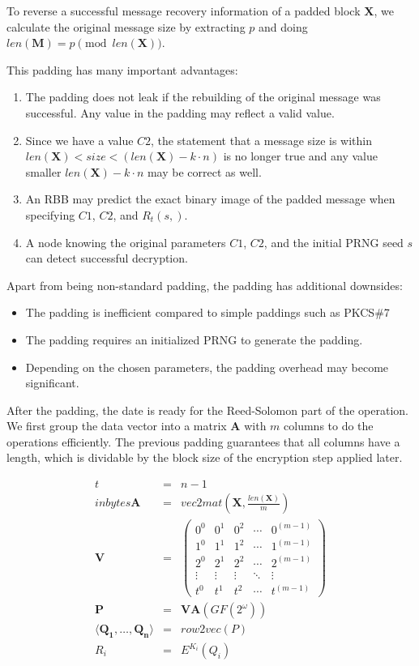 To reverse a successful message recovery information of a padded block $\mathbf{X}$, we calculate the original message size by extracting $p$ and doing $len(\mathbf{M})=p \pmod{ len(\mathbf{X})}$.

This padding has many important advantages:
\begin{enumerate}
	\item The padding does not leak if the rebuilding of the original message was successful. Any value in the padding may reflect a valid value.
	\item Since we have a value $C2$, the statement that a message size is within $len(\mathbf{X})<size<(len(\mathbf{X})-k\cdot n)$ is no longer true and any value smaller $len(\mathbf{X})-k\cdot n$ may be correct as well.
	\item An RBB may predict the exact binary image of the padded message when specifying $C1$, $C2$, and $R_{t}(s,)$.
	\item A node knowing the original parameters $C1$, $C2$, and the initial PRNG seed $s$ can detect successful decryption.
\end{enumerate}

Apart from being non-standard padding, the padding has additional downsides:
\begin{itemize}
	\item The padding is inefficient compared to simple paddings such as PKCS\#7
	\item The padding requires an initialized PRNG to generate the padding.
	\item Depending on the chosen parameters, the padding overhead may become significant. 
\end{itemize}

After the padding, the date is ready for the Reed-Solomon part of the operation. We first group the data vector into a matrix $\mathbf{A}$ with $m$ columns to do the operations efficiently. The previous padding guarantees that all columns have a length, which is dividable by the block size of the encryption step applied later.

\begin{eqnarray}
t          & = & n-1\\in bytes
\mathbf{A} & = & vec2mat\left(\mathbf{X},\frac{len\left(\mathbf{X}\right)}{m}\right)\\
\mathbf{V} & = & \left(\begin{matrix}
0^0 & 0^1 & 0^2 & \cdots & 0^{(m-1)} \\
1^0 & 1^1 & 1^2 & \cdots & 1^{(m-1)} \\
2^0 & 2^1 & 2^2 & \cdots & 2^{(m-1)} \\
\vdots & \vdots & \vdots & \ddots & \vdots \\
t^0 & t^1 & t^2 & \cdots & t^{(m-1)}
\end{matrix}\right)\\
\mathbf{P} & = & \mathbf{V}\mathbf{A} \left(GF\left(2^\omega\right)\right)\\
\langle \mathbf{Q_1}, \ldots , \mathbf{Q_n} \rangle & = & row2vec(P)\\
R_i & = & E^{K_i}\left(Q_i\right)
\end{eqnarray}    

